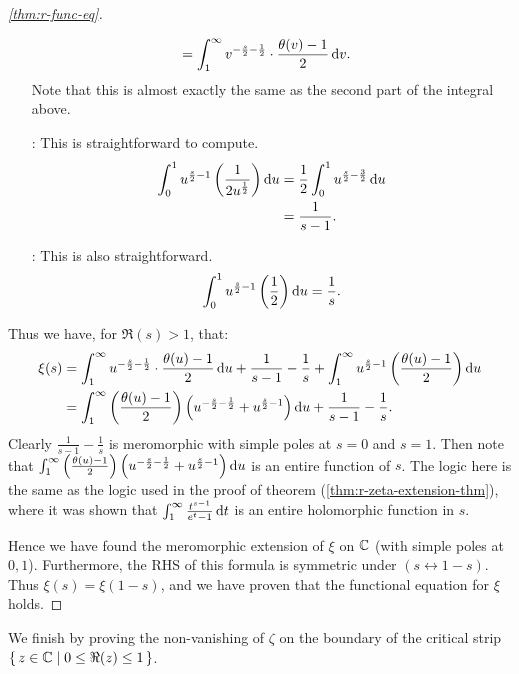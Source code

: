 \begin{proof}[\ref{thm:r-func-eq}]
\begin{enumerate}
\begin{align*}
        &= \int_1^\infty v^{-\frac{s}{2} - \frac{1}{2}} \cdot \frac{\theta (v ) - 1}{2} \dif v.
    \end{align*}
    Note that this is almost exactly the same as the second part of the integral above.
    \item[\circled{2} :] This is straightforward to compute.
    \begin{align*}
        \int_0^1 u^{\frac{s}{2} - 1} \br{\frac{1}{2 u^{\frac{1}{2}}}} \dif u &= \frac{1}{2} \int_0^1 u^{\frac{s}{2} - \frac{3}{2}} \dif u\\
        &= \frac{1}{s-1}.
    \end{align*}
    \item[\circled{3} :] This is also straightforward.
    \begin{align*}
        \int_0^1 u^{\frac{s}{2} - 1} \br{\frac{1}{2}} \dif u = \frac{1}{s}.
    \end{align*}
\end{enumerate}
Thus we have, for $\Re(s) > 1$, that:
\begin{align*}
    \xi(s) &= \int_1^\infty u^{-\frac{s}{2} - \frac{1}{2}} \cdot \frac{\theta (u ) - 1}{2} \dif u + \frac{1}{s-1} - \frac{1}{s} + \int_1^\infty u^{\frac{s}{2} - 1} \br{\frac{\theta(u) - 1}{2}} \dif u\\
    &= \int_1^\infty \br{\frac{\theta(u) - 1}{2}} \br{u^{-\frac{s}{2} - \frac{1}{2}} + u^{\frac{s}{2}-1}  } \dif u +\frac{1}{s-1} - \frac{1}{s}.
\end{align*}
Clearly $\frac{1}{s-1} - \frac{1}{s}$ is meromorphic with simple poles at $s=0$ and $s=1$. Then note that $\int_1^\infty \br{\frac{\theta(u) - 1}{2}} \br{u^{-\frac{s}{2} - \frac{1}{2}} + u^{\frac{s}{2} -1  }} \dif u$ is an entire function of $s$. The logic here is the same as the logic used in the proof of theorem (\ref{thm:r-zeta-extension-thm}), where it was shown that $\int_1^\infty \frac{t^{s-1}}{e^t - 1} \dif t$ is an entire holomorphic function in $s$.

Hence we have found the meromorphic extension of $\xi$ on $\mathbb{C}$ (with simple poles at $0,1$). Furthermore, the RHS of this formula is symmetric under $(s \leftrightarrow 1-s)$. Thus $\xi(s) = \xi(1-s)$, and we have proven that the functional equation for $\xi$ holds.

\end{proof}

We finish by proving the non-vanishing of $\zeta$ on the boundary of the critical strip $\set{z \in \mathbb{C}\mid 0 \leq \Re(z) \leq 1}$.

